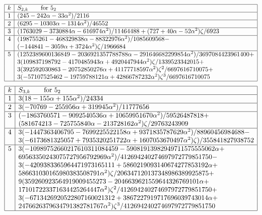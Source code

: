 \documentclass[12pt]{amsart}
\theoremstyle{definition}
\def\a{\alpha}
\begin{document}
{\small
$$
\begin{array}{|c|l|} \hline
k & S_{2,k} \qquad \text{for $5_2$} \\ \hline
1 & (245 - 242 \a - 33 \a^2)/2116 \\ \hline
2 & (6295 - 10303 \a - 1314 \a^2)/46552 \\ \hline
3 & (1763029 - 3730884 \a - 616974 \a^2)/11464488 + 
(727 + 40 \a - 52 \a^2) \zeta/6923
\\ \hline
4 & (198755261 - 468329838 \a - 88322976 \a^2)/1085609568 - 
\\
& 
(-144841 - 3059 \a + 3724 \a^2) \zeta/1966684
\\ \hline
5 & (1252389600136849 - 2036921357788788 \a - 
  291646682299854 \a^2)/3697084423961400 + 
\\ %
&
3 (109837198792 - 4170485943 \a + 4920447944 \a^2) \zeta/1339523342015 + 
\\ %
&
3(392592030863 - 20752850276 \a + 
    41177718597 \a^2) \zeta^2/6697616710075 + 
\\ %
&
3(-57107525462 - 19759788121 \a + 42866787232 \a^2) 
\zeta^3/6697616710075
\\ \hline
\end{array}
$$
$$
\begin{array}{|c|l|} \hline
k & S_{3,k} \qquad \text{for $5_2$} \\ \hline
1 & 3(18 - 155 \a + 155 \a^2)/24334\\ \hline
2 & 3(-70769 - 255956 \a + 319945 \a^2)/11777656 \\ \hline
3 & (-1863760571 - 9092540536 \a + 10659951670 \a^2)/59526487818
+
\\ %
&
(581674213 - 725755840 \a - 213728162 \a^2) \zeta/29763243909
\\ \hline
4 & 3(-1447363406795 - 7699225522158 \a + 
    9371835787629 \a^2)/88960456984688 -
\\ %
&
3(-6173681325057 + 7935320251722 \a + 1607053670497 \a^2) 
\zeta)/355841827938752
\\ \hline
5 & 3
(-10989752660217610311084459 -
59081913982949711575555062 \a + 
\\
&
      69563350243075727956792969 \a^2)/412694240274697972779851750 - 
\\
&
3(-4209383365964471973165111 + 
      5860219093140674277853192 \a + 
\\
&
586631030165980383508791 \a^2) 
\zeta/206347120137348986389925875
 + 
\\
&
9 (359260923564919009455273 - 
      2046639621559644326769101 \a + 
\\
&
      171017223371634425264447 \a^2) \zeta^2/412694240274697972779851750 + 
\\
&
3(-6713426920522807160021312 + 
      3867227919717696039743014 \a + 
\\
&
      2476626379634791382781767 \a^2) \zeta^3/412694240274697972779851750
\\ \hline
\end{array}
$$
}
\end{document}
